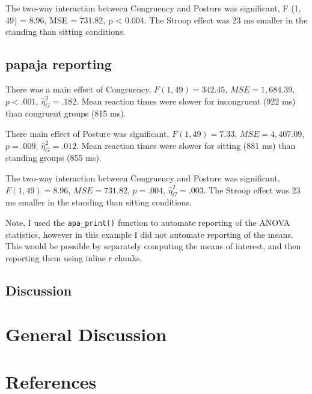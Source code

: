 \documentclass[
  man]{apa6}
\begin{document}
The two-way interaction between Congruency and Posture was significant, F (1, 49) = 8.96, MSE = 731.82, p \textless{} 0.004. The Stroop effect was 23 ms smaller in the standing than sitting conditions.

\hypertarget{papaja-reporting}{%
\subsection{papaja reporting}\label{papaja-reporting}}

There was a main effect of Congruency, \(F(1, 49) = 342.45\), \(\mathit{MSE} = 1,684.39\), \(p < .001\), \(\hat{\eta}^2_G = .182\). Mean reaction times were slower for incongruent (922 ms) than congruent groups (815 ms).

There main effect of Posture was significant, \(F(1, 49) = 7.33\), \(\mathit{MSE} = 4,407.09\), \(p = .009\), \(\hat{\eta}^2_G = .012\). Mean reaction times were slower for sitting (881 ms) than standing groups (855 ms).

The two-way interaction between Congruency and Posture was significant, \(F(1, 49) = 8.96\), \(\mathit{MSE} = 731.82\), \(p = .004\), \(\hat{\eta}^2_G = .003\). The Stroop effect was 23 ms smaller in the standing than sitting conditions.

Note, I used the \texttt{apa\_print()} function to automate reporting of the ANOVA statistics, however in this example I did not automate reporting of the means. This would be possible by separately computing the means of interest, and then reporting them using inline r chunks.

\hypertarget{discussion}{%
\subsection{Discussion}\label{discussion}}

\hypertarget{general-discussion}{%
\section{General Discussion}\label{general-discussion}}

\newpage

\hypertarget{references}{%
\section{References}\label{references}}

\begingroup
\setlength{\parindent}{-0.5in}
\setlength{\leftskip}{0.5in}
\end{document}
